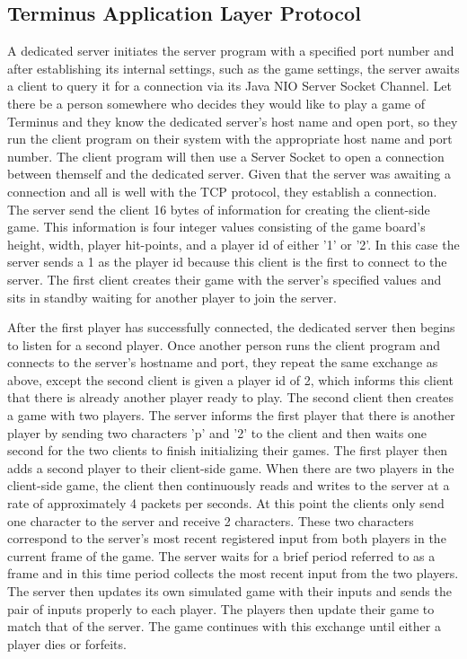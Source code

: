 \documentclass[12pt]{article}
\begin{document}
\subsection{Terminus Application Layer Protocol}\label{appLayer}
    A dedicated server initiates the server program with a specified port number and after establishing its internal settings, such as the game settings, the server awaits a client to query it for a connection via its Java NIO Server Socket Channel. Let there be a person somewhere who decides they would like to play a game of Terminus and they know the dedicated server's host name and open port, so they run the client program on their system with the appropriate host name and port number. The client program will then use a Server Socket to open a connection between themself and the dedicated server. Given that the server was awaiting a connection and all is well with the TCP protocol, they establish a connection. The server send the client 16 bytes of information for creating the client-side game. This information is four integer values consisting of the game board's height, width, player hit-points, and a player id of either '1' or '2'. In this case the server sends a 1 as the player id because this client is the first to connect to the server. The first client creates their game with the server's specified values and sits in standby waiting for another player to join the server.
    
    After the first player has successfully connected, the dedicated server then begins to listen for a second player. Once another person runs the client program and connects to the server's hostname and port, they repeat the same exchange as above, except the second client is given a player id of 2, which informs this client that there is already another player ready to play. The second client then creates a game with two players. The server informs the first player that there is another player by sending two characters 'p' and '2' to the client and then waits one second for the two clients to finish initializing their games. The first player then adds a second player to their client-side game. When there are two players in the client-side game, the client then continuously reads and writes to the server at a rate of approximately 4 packets per seconds. At this point the clients only send one character to the server and receive 2 characters. These two characters correspond to the server's most recent registered input from both players in the current frame of the game. The server waits for a brief period referred to as a frame and in this time period collects the most recent input from the two players. The server then updates its own simulated game with their inputs and sends the pair of inputs properly to each player. The players then update their game to match that of the server. The game continues with this exchange until either a player dies or forfeits.
    
\end{document}
